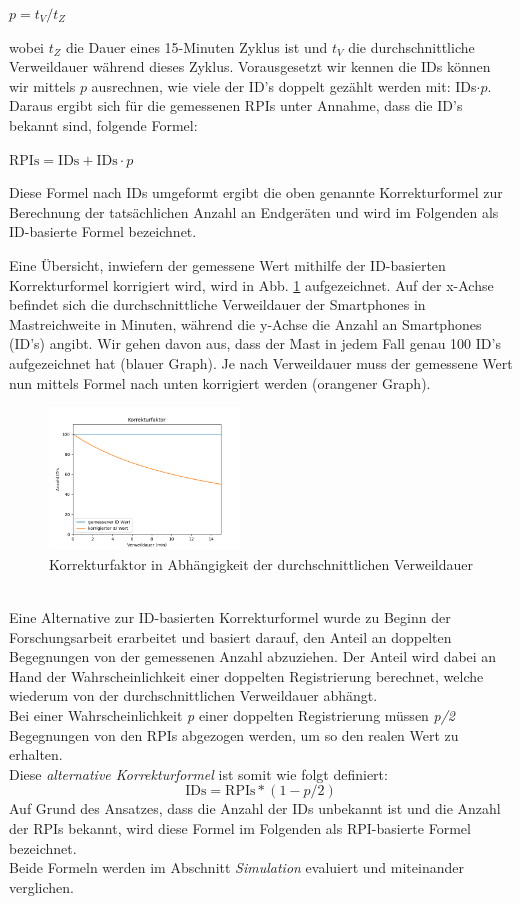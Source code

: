 \documentclass[conference,compsoc]{IEEEtran}
\begin{document}
\centerline{$p = t_V / t_Z$}
wobei $t_Z$ die Dauer eines 15-Minuten Zyklus ist und $t_V$ die durchschnittliche Verweildauer während dieses Zyklus.
Vorausgesetzt wir kennen die \glqq IDs\grqq{} können wir mittels $p$ ausrechnen, wie viele der ID's doppelt gezählt werden mit: IDs$\cdot p$. 
Daraus ergibt sich für die gemessenen \glqq RPIs\grqq{} unter Annahme, dass die ID's bekannt sind, folgende Formel: 
\centerline{$\text{RPIs} = \text{IDs} + \text{IDs} \cdot p $}
Diese Formel nach \glqq IDs\grqq{} umgeformt ergibt die oben genannte Korrekturformel zur Berechnung der tatsächlichen Anzahl an Endgeräten und wird im Folgenden als ID-basierte Formel bezeichnet.

Eine Übersicht, inwiefern der gemessene Wert mithilfe der ID-basierten Korrekturformel korrigiert wird, wird in Abb. \ref{cor_factor} aufgezeichnet. 
Auf der x-Achse befindet sich die durchschnittliche Verweildauer der Smartphones in Mastreichweite in Minuten, während die y-Achse die Anzahl an Smartphones (ID's) angibt.
Wir gehen davon aus, dass der Mast in jedem Fall genau 100 ID's aufgezeichnet hat (blauer Graph). Je nach Verweildauer muss der gemessene Wert nun mittels Formel nach unten korrigiert werden (orangener Graph).\\
\begin{figure}[h]
	\centering
	\includegraphics[width=0.45\textwidth]{"Korrekturfaktor"}
	\caption{Korrekturfaktor in Abhängigkeit der durchschnittlichen Verweildauer}
	\label{cor_factor}
\end{figure} \\

Eine Alternative zur ID-basierten Korrekturformel wurde zu Beginn der Forschungsarbeit erarbeitet und basiert darauf, den Anteil an doppelten Begegnungen von der gemessenen Anzahl abzuziehen. 
Der Anteil wird dabei an Hand der Wahrscheinlichkeit einer doppelten Registrierung berechnet, welche wiederum von der durchschnittlichen Verweildauer abhängt.\\
Bei einer Wahrscheinlichkeit \textit{p} einer doppelten Registrierung müssen \textit{p/2} Begegnungen von den RPIs abgezogen werden, um so den realen Wert zu erhalten.\\
Diese \textit{alternative Korrekturformel} ist somit wie folgt definiert:
\begin{equation}
	\text{IDs} = \text{RPIs} * (1-p/2)
\end{equation}
Auf Grund des Ansatzes, dass die Anzahl der IDs unbekannt ist und die Anzahl der RPIs bekannt, wird diese Formel im Folgenden als RPI-basierte Formel bezeichnet.\\
Beide Formeln werden im Abschnitt \textit{Simulation} evaluiert und miteinander verglichen.\\
\end{document}
